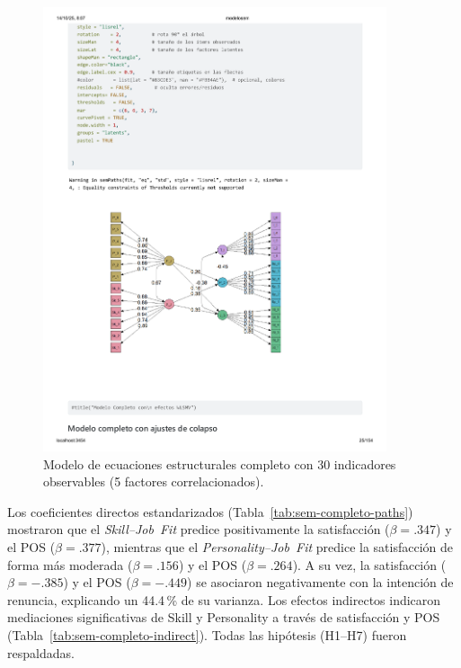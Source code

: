 \begin{figure}[htbp]
\centering
\includegraphics[width=0.9\textwidth]{figures/modelo0.pdf}
\caption{Modelo de ecuaciones estructurales completo con 30 indicadores observables (5 factores correlacionados).}
\label{fig:sem-completo}
\end{figure}

Los coeficientes directos estandarizados (Tabla \ref{tab:sem-completo-paths}) mostraron que el \emph{Skill--Job Fit} predice positivamente la satisfacción ($\beta=.347$) y el POS ($\beta=.377$), mientras que el \emph{Personality--Job Fit} predice la satisfacción de forma más moderada ($\beta=.156$) y el POS ($\beta=.264$). A su vez, la satisfacción ($\beta=-.385$) y el POS ($\beta=-.449$) se asociaron negativamente con la intención de renuncia, explicando un 44.4\,\% de su varianza. Los efectos indirectos indicaron mediaciones significativas de Skill y Personality a través de satisfacción y POS (Tabla \ref{tab:sem-completo-indirect}). Todas las hipótesis (H1–H7) fueron respaldadas.


